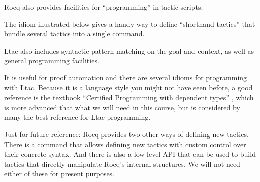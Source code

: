 \documentclass[12pt]{report}
\begin{document}
 Rocq also provides facilities for ``programming'' in tactic
    scripts.


    The  idiom illustrated below gives a handy way to define
    ``shorthand tactics'' that bundle several tactics into a single
    command.


    Ltac also includes syntactic pattern-matching on the goal and
    context, as well as general programming facilities.


    It is useful for proof automation and there are several idioms for
    programming with Ltac. Because it is a language style you might
    not have seen before, a good reference is the textbook ``Certified
    Programming with dependent types'' , which is more advanced
    that what we will need in this course, but is considered by many
    the best reference for Ltac programming.


    Just for future reference: Rocq provides two other ways of defining
    new tactics.  There is a   command that allows
    defining new tactics with custom control over their concrete
    syntax. And there is also a low-level API that can be used to
    build tactics that directly manipulate Rocq's internal structures.
    We will not need either of these for present purposes.
\end{document}
